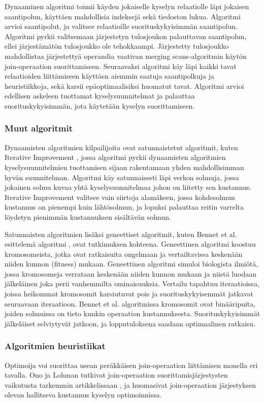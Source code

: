 \documentclass[finnish]{tktltiki2}
\theoremstyle{definition}
\theoremstyle{remark}
\begin{document}
Dynaaminen algoritmi toimii käyden jokaiselle kyselyn relaatiolle läpi jokaisen saantipolun, käyttäen mahdollisia indeksejä sekä tiedoston lukua. Algoritmi arvioi saantipolut, ja valitsee relaatioille suorituskykyisimmän saantipolun. Algoritmi pyrkii valitsemaan järjestetyn tulosjoukon palauttavan saantipolun, ellei järjestämätön tulosjoukko ole tehokkaampi. Järjestetty tulosjoukko mahdollistaa järjestettyä operandia vaativan merging scans-algoritmin käytön join-operaation suorittamiseen. Seuraavaksi algoritmi käy läpi kaikki tavat relaatioiden liittämiseen käyttäen aiemmin saatuja saantipolkuja ja heuristiikkoja, sekä karsii epäoptimaalisiksi huomatut tavat. Algoritmi arvioi edellisen askeleen tuottamat kyselysuunnitelmat ja palauttaa suorituskykyisimmän, jota käytetään kyselyn suorittamiseen.
\subsubsection{Muut algoritmit}
Dynaamisten algoritmien kilpailijoita ovat satunnaistetut algoritmit, kuten Iterative Improvement \cite{nahar1986simulated}, jossa algoritmi pyrkii dynaamisten algoritmien kyselysuunnitelmien tuottamisen sijaan rakentamaan yhden mahdollisimman hyvän suunnitelman. Algoritmi käy satunnaisesti läpi verkon solmuja, jossa jokainen solmu kuvaa yhtä kyselysuunnitelmaa johon on liitetty sen kustannus. Iterative Improvement valitsee vain siirtoja alamäkeen, jossa kohdesolmun kustannus on pienempi kuin lähtösolmun, ja lopuksi palauttaa reitin varrelta löydetyn pienimmän kustannuksen sisältävän solmun.

Satunnaisten algoritmien lisäksi geneettiset algoritmit, kuten Bennet et al. esittelemä algoritmi \cite{bennett1991genetic}, ovat tutkimuksen kohteena. Geneettinen algoritmi koostuu kromosomeista, jotka ovat ratkaisuita ongelmaan ja vertailtavissa keskenään niiden kunnon (fitness) mukaan. Geneettinen algoritmi simuloi biologista ilmiötä, jossa kromosomeja verrataan keskenään niiden kunnon mukaan ja niistä luodaan jälkeläinen joka perii vanhemmilta ominaisuuksia. Vertailu tapahtuu iteraatioissa, joissa heikommat kromosomit karsiutuvat pois ja suorituskykyisemmät jatkavat seuraavaan iteraatioon. Bennet et al. algoritmissa kromosomit ovat binääripuita, joiden solmuissa on tieto kunkin operaation kustannuksesta. Suorituskykyisimmät jälkeläiset selviytyvät jatkoon, ja lopputuloksena saadaan optimaalinen ratkaisu. 
\subsubsection{Algoritmien heuristiikat}
Optimoija voi suorittaa usean peräkkäisen join-operaation liittämisen monella eri tavalla. Ono ja Lohman tutkivat join-operaation suorittamisjärjestysten vaikutusta tarkemmin artikkelissaan \cite{ono1990}, ja huomasivat join-operaation järjestyksen olevan hallitseva kustannus kyselyn optimoinnissa. 
\end{document}
